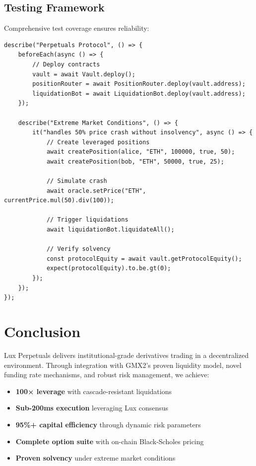 \documentclass[11pt,a4paper]{article}
\begin{document}
\subsection{Testing Framework}

Comprehensive test coverage ensures reliability:

\begin{lstlisting}[language=Solidity, caption={Integration Test Suite}]
describe("Perpetuals Protocol", () => {
    beforeEach(async () => {
        // Deploy contracts
        vault = await Vault.deploy();
        positionRouter = await PositionRouter.deploy(vault.address);
        liquidationBot = await LiquidationBot.deploy(vault.address);
    });

    describe("Extreme Market Conditions", () => {
        it("handles 50% price crash without insolvency", async () => {
            // Create leveraged positions
            await createPosition(alice, "ETH", 100000, true, 50);
            await createPosition(bob, "ETH", 50000, true, 25);

            // Simulate crash
            await oracle.setPrice("ETH", currentPrice.mul(50).div(100));

            // Trigger liquidations
            await liquidationBot.liquidateAll();

            // Verify solvency
            const protocolEquity = await vault.getProtocolEquity();
            expect(protocolEquity).to.be.gt(0);
        });
    });
});
\end{lstlisting}

\section{Conclusion}

Lux Perpetuals delivers institutional-grade derivatives trading in a decentralized environment. Through integration with GMX2's proven liquidity model, novel funding rate mechanisms, and robust risk management, we achieve:

\begin{itemize}
    \item \textbf{100× leverage} with cascade-resistant liquidations
    \item \textbf{Sub-200ms execution} leveraging Lux consensus
    \item \textbf{95\%+ capital efficiency} through dynamic risk parameters
    \item \textbf{Complete option suite} with on-chain Black-Scholes pricing
    \item \textbf{Proven solvency} under extreme market conditions
\end{itemize}
\end{document}
